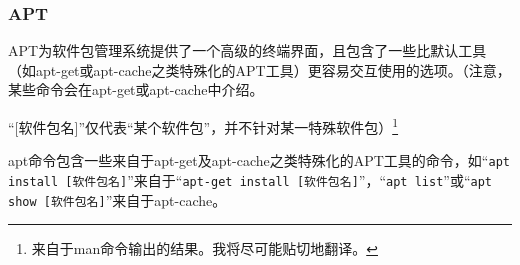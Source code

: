 \subsubsection{APT}
\cite{manAPT}\par
APT为软件包管理系统提供了一个高级的终端界面，且包含了一些比默认工具（如apt-get或apt-cache之类特殊化的APT工具）更容易交互使用的选项。（注意，某些命令会在apt-get或apt-cache中介绍。 \par “[软件包名]”仅代表“某个软件包”，并不针对某一特殊软件包）\footnote{来自于man命令输出的结果。我将尽可能贴切地翻译。 }\par apt命令包含一些来自于apt-get及apt-cache之类特殊化的APT工具的命令，如“\verb|apt install [软件包名]|”来自于“\verb|apt-get install [软件包名]|”，“\verb|apt list|”或“\verb|apt show [软件包名]|”来自于apt-cache。\par
